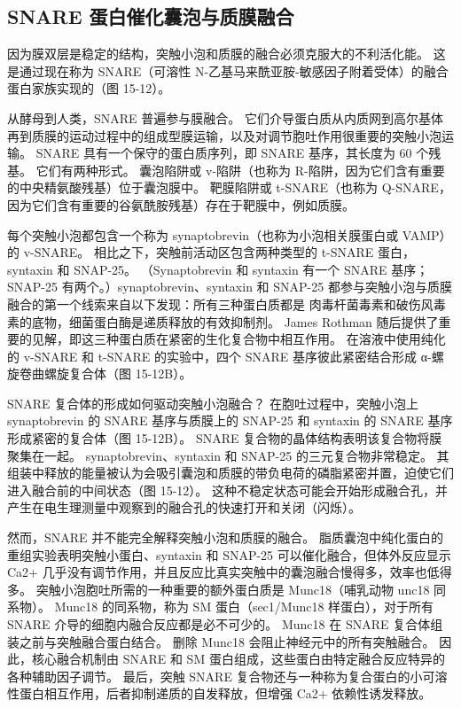 \subsection{SNARE 蛋白催化囊泡与质膜融合}
因为膜双层是稳定的结构，突触小泡和质膜的融合必须克服大的不利活化能。 这是通过现在称为 SNARE（可溶性 N-乙基马来酰亚胺-敏感因子附着受体）的融合蛋白家族实现的（图 15-12）。

从酵母到人类，SNARE 普遍参与膜融合。 它们介导蛋白质从内质网到高尔基体再到质膜的运动过程中的组成型膜运输，以及对调节胞吐作用很重要的突触小泡运输。 SNARE 具有一个保守的蛋白质序列，即 SNARE 基序，其长度为 60 个残基。 它们有两种形式。 囊泡陷阱或 v-陷阱（也称为 R-陷阱，因为它们含有重要的中央精氨酸残基）位于囊泡膜中。 靶膜陷阱或 t-SNARE（也称为 Q-SNARE，因为它们含有重要的谷氨酰胺残基）存在于靶膜中，例如质膜。

每个突触小泡都包含一个称为 synaptobrevin（也称为小泡相关膜蛋白或 VAMP）的 v-SNARE。 相比之下，突触前活动区包含两种类型的 t-SNARE 蛋白，syntaxin 和 SNAP-25。 （Synaptobrevin 和 syntaxin 有一个 SNARE 基序；SNAP-25 有两个。）synaptobrevin、syntaxin 和 SNAP-25 都参与突触小泡与质膜融合的第一个线索来自以下发现：所有三种蛋白质都是 肉毒杆菌毒素和破伤风毒素的底物，细菌蛋白酶是递质释放的有效抑制剂。 James Rothman 随后提供了重要的见解，即这三种蛋白质在紧密的生化复合物中相互作用。 在溶液中使用纯化的 v-SNARE 和 t-SNARE 的实验中，四个 SNARE 基序彼此紧密结合形成 α-螺旋卷曲螺旋复合体（图 15-12B）。

SNARE 复合体的形成如何驱动突触小泡融合？ 在胞吐过程中，突触小泡上 synaptobrevin 的 SNARE 基序与质膜上的 SNAP-25 和 syntaxin 的 SNARE 基序形成紧密的复合体（图 15-12B）。 SNARE 复合物的晶体结构表明该复合物将膜聚集在一起。 synaptobrevin、syntaxin 和 SNAP-25 的三元复合物非常稳定。 其组装中释放的能量被认为会吸引囊泡和质膜的带负电荷的磷脂紧密并置，迫使它们进入融合前的中间状态（图 15-12）。 这种不稳定状态可能会开始形成融合孔，并产生在电生理测量中观察到的融合孔的快速打开和关闭（闪烁）。

然而，SNARE 并不能完全解释突触小泡和质膜的融合。 脂质囊泡中纯化蛋白的重组实验表明突触小蛋白、syntaxin 和 SNAP-25 可以催化融合，但体外反应显示 Ca2+ 几乎没有调节作用，并且反应比真实突触中的囊泡融合慢得多，效率也低得多。 突触小泡胞吐所需的一种重要的额外蛋白质是 Munc18（哺乳动物 unc18 同系物）。 Munc18 的同系物，称为 SM 蛋白（sec1/Munc18 样蛋白），对于所有 SNARE 介导的细胞内融合反应都是必不可少的。 Munc18 在 SNARE 复合体组装之前与突触融合蛋白结合。 删除 Munc18 会阻止神经元中的所有突触融合。 因此，核心融合机制由 SNARE 和 SM 蛋白组成，这些蛋白由特定融合反应特异的各种辅助因子调节。 最后，突触 SNARE 复合物还与一种称为复合蛋白的小可溶性蛋白相互作用，后者抑制递质的自发释放，但增强 Ca2+ 依赖性诱发释放。

